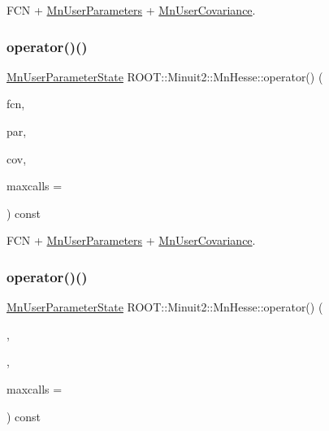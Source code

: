 F\+CN + \mbox{\hyperlink{classROOT_1_1Minuit2_1_1MnUserParameters}{Mn\+User\+Parameters}} + \mbox{\hyperlink{classROOT_1_1Minuit2_1_1MnUserCovariance}{Mn\+User\+Covariance}}. 

\mbox{\label{classROOT_1_1Minuit2_1_1MnHesse_aeba6a2c85b9bda7785d418a6e2605722}} 
\subsubsection{\texorpdfstring{operator()()}{operator()()}\hspace{0.1cm}{\footnotesize\ttfamily [10/16]}}
{\footnotesize\ttfamily \mbox{\hyperlink{classROOT_1_1Minuit2_1_1MnUserParameterState}{Mn\+User\+Parameter\+State}} R\+O\+O\+T\+::\+Minuit2\+::\+Mn\+Hesse\+::operator() (\begin{DoxyParamCaption}\item[{const \mbox{\hyperlink{classROOT_1_1Minuit2_1_1FCNBase}{F\+C\+N\+Base}} \&}]{fcn,  }\item[{const \mbox{\hyperlink{classROOT_1_1Minuit2_1_1MnUserParameters}{Mn\+User\+Parameters}} \&}]{par,  }\item[{const \mbox{\hyperlink{classROOT_1_1Minuit2_1_1MnUserCovariance}{Mn\+User\+Covariance}} \&}]{cov,  }\item[{unsigned int}]{maxcalls = {} }\end{DoxyParamCaption}) const}



F\+CN + \mbox{\hyperlink{classROOT_1_1Minuit2_1_1MnUserParameters}{Mn\+User\+Parameters}} + \mbox{\hyperlink{classROOT_1_1Minuit2_1_1MnUserCovariance}{Mn\+User\+Covariance}}. 

\mbox{\label{classROOT_1_1Minuit2_1_1MnHesse_a4ebea568262a19a0cfec1473ce7a5f0f}} 
\subsubsection{\texorpdfstring{operator()()}{operator()()}\hspace{0.1cm}{\footnotesize\ttfamily [11/16]}}
{\footnotesize\ttfamily \mbox{\hyperlink{classROOT_1_1Minuit2_1_1MnUserParameterState}{Mn\+User\+Parameter\+State}} R\+O\+O\+T\+::\+Minuit2\+::\+Mn\+Hesse\+::operator() (\begin{DoxyParamCaption}\item[{const \mbox{\hyperlink{classROOT_1_1Minuit2_1_1FCNBase}{F\+C\+N\+Base}} \&}]{,  }\item[{const \mbox{\hyperlink{classROOT_1_1Minuit2_1_1MnUserParameterState}{Mn\+User\+Parameter\+State}} \&}]{,  }\item[{unsigned int}]{maxcalls = {} }\end{DoxyParamCaption}) const}




